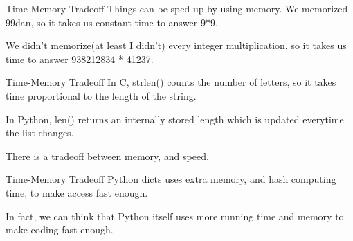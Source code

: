 \documentclass{beamer}
\begin{document}
\begin{frame}{Time-Memory Tradeoff}
  Things can be sped up by using memory.
  We memorized 99dan, so it takes us constant time to answer 9*9.

  We didn't memorize(at least I didn't) every integer multiplication,
  so it takes us time to answer 938212834 * 41237.
\end{frame}

\begin{frame}{Time-Memory Tradeoff}
  In C, strlen() counts the number of letters, so it takes time proportional to the length of the string.

  In Python, len() returns an internally stored length which is updated everytime the list changes.

  There is a tradeoff between memory, and speed.
\end{frame}

\begin{frame}{Time-Memory Tradeoff}
  Python dicts uses extra memory, and hash computing time, to make
  access fast enough.

  In fact, we can think that Python itself uses more running time and memory to make coding fast enough.
\end{frame}
\end{document}
